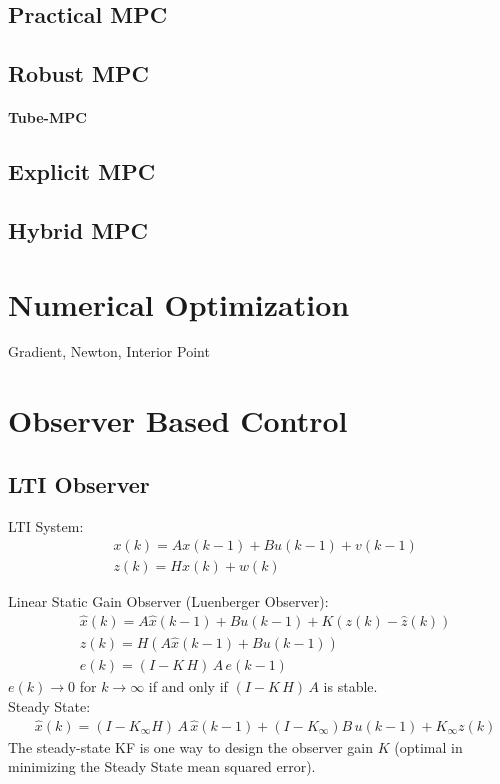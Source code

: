 \documentclass[landscape,a4paper,8pt]{scrartcl}
\begin{document}
\begin{multicols*}{3}
\subsection{Practical MPC}
\subsection{Robust MPC}
\paragraph{Tube-MPC}

\subsection{Explicit MPC}

\subsection{Hybrid MPC}

\section{Numerical Optimization}
Gradient, Newton, Interior Point


\section{Observer Based Control}
\subsection{LTI Observer}
LTI System: 
\begin{align*}
& x(k) = A x(k-1) + B u (k-1) + v(k-1) \\
& z(k) = H x(k) + w(k)
\end{align*}

Linear Static Gain Observer (Luenberger Observer):
\begin{align*}
&\hat{x}(k) = A \hat{x}(k-1) + B u (k-1) + K(z(k) - \hat{z}(k)) \\
&\hat{z}(k) = H ( A \hat{x}(k-1) + B u(k-1)) \\
&e(k)= (I-K \, H)\, A \,  e(k-1)
\end{align*}
$e(k) \to 0$ for $k \to \infty$ if and only if $(I-K \, H)\, A$ is stable.\\

Steady State: 
\begin{align*}
&\hat{x}(k) = (I-K_\infty H )\, A\, \hat{x}(k-1) + (I-K_\infty) B \, u(k-1) + K_\infty z(k)
\end{align*}
The steady-state KF is one way to design the observer gain $K$ (optimal in minimizing the Steady State mean squared error). \\


\end{multicols*}
\end{document}
